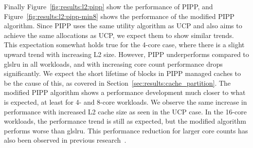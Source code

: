 Finally Figure~\ref{fig:results:l2:pipp} show the performance of PIPP, and Figure~\ref{fig:results:l2:pipp-min8} shows the performance of the modified PIPP algorithm.
Since PIPP uses the same utility algorithm as UCP and also aims to achieve the same allocations as UCP, we expect them to show similar trends.
This expectation somewhat holds true for the 4-core case, where there is a slight upward trend with increasing L2 size.
However, PIPP underperforms compared to gls{lru} in all workloads, and with increasing core count performance drops significantly.
We expect the short lifetime of blocks in PIPP managed caches to be the cause of this, as covered in Section~\ref{sec:results:cache_partition}.
The modified PIPP algorithm shows a performance development much closer to what is expected, at least for 4- and 8-core workloads.
We observe the same increase in performance with increased L2 cache size as seen in the UCP case. 
In the 16-core workloads, the performance trend is still as expected, but the modified algorithm performs worse than gls{lru}.
This performance reduction for larger core counts has also been observed in previous research~\cite{Manikantan2012}.
